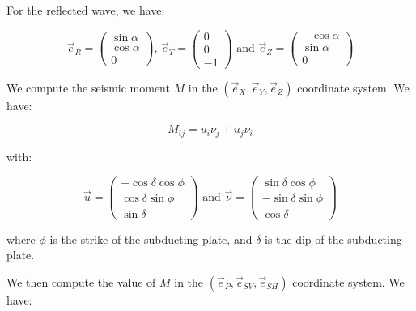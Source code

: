 \documentclass[methods.tex]{subfiles}
\begin{document}
For the reflected wave, we have:

\begin{equation}
\vec{e}_R = \begin{pmatrix}
\sin \alpha \\
\cos \alpha \\
0
\end{pmatrix} \text{, } \vec{e}_T = \begin{pmatrix}
0 \\
0 \\
- 1
\end{pmatrix} \text{ and } \vec{e}_Z = \begin{pmatrix}
- \cos \alpha \\
\sin \alpha \\
0
\end{pmatrix}
\end{equation}

We compute the seismic moment $M$ in the $(\vec{e}_X, \vec{e}_Y, \vec{e}_Z)$ coordinate system. We have:

\begin{equation}
M_{ij} = u_i \nu_j + u_j \nu_i
\end{equation}

with:

\begin{equation}
\vec{u} = \begin{pmatrix}
- \cos \delta \cos \phi \\
\cos \delta \sin \phi \\
\sin \delta
\end{pmatrix} \text{ and } \vec{\nu} = \begin{pmatrix}
\sin \delta \cos \phi \\
- \sin \delta \sin \phi \\
\cos \delta 
\end{pmatrix}
\end{equation}

where $\phi$ is the strike of the subducting plate, and $\delta$ is the dip of the subducting plate.

We then compute the value of $M$ in the $(\vec{e}_P, \vec{e}_{SV}, \vec{e}_{SH})$ coordinate system. We have:
\end{document}
